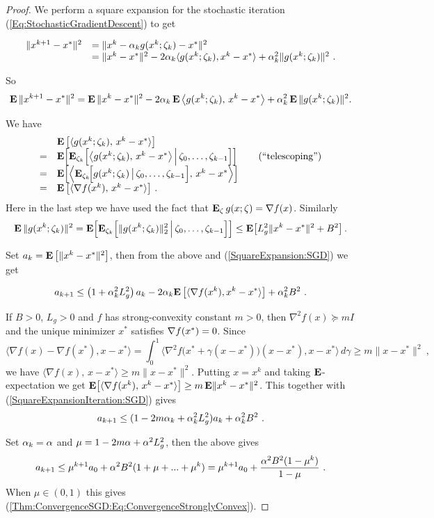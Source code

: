 \begin{proof}
We perform a square expansion for the stochastic iteration (\ref{Eq:StochasticGradientDescent}) to get

\begin{equation}\label{SquareExpansion:SGD}
\begin{array}{ll}
\|x^{k+1}-x^*\|^2&=\|x^k-\alpha_k g(x^k; \zeta_k)-x^*\|^2
\\
&=\|x^k-x^*\|^2-2\alpha_k\langle g(x^k; \zeta_k), x^k-x^*\rangle+\alpha_k^2\|g(x^k; \zeta_k)\|^2 \ .
\end{array}
\end{equation}

So
$$\mathbf E\,\|x^{k+1}-x^*\|^2
=
\mathbf E\,\|x^k-x^*\|^2
-2\alpha_k\,\mathbf E\,\bigl\langle g(x^k;\zeta_k),\,x^k-x^*\bigr\rangle
+\alpha_k^2\,\mathbf E\,\|g(x^k;\zeta_k)\|^2 .
$$

We have
$$\begin{array}{ll}
& \mathbf E\,\bigl[\langle g(x^k;\zeta_k),\,x^k-x^*\rangle\bigr]
\\
= &
\mathbf E\!\left[
\mathbf E_{\zeta_k}
\Bigl[
\bigl\langle g(x^k;\zeta_k),\,x^k-x^*\bigr\rangle
\,\Big|\,\zeta_0,\ldots,\zeta_{k-1}
\Bigr]
\right]
\qquad \text{(``telescoping'')}
\\
= & 
\mathbf E\!\left[
\left\langle
\mathbf E_{\zeta_k}\!\Bigl[g(x^k;\zeta_k)\,\big|\,\zeta_0,\ldots,\zeta_{k-1}\Bigr],
\,x^k-x^*
\right\rangle
\right]
\\
= & 
\mathbf E\,\bigl[\langle \nabla f(x^k),\,x^k-x^*\rangle\bigr] \ .
\end{array}
$$
Here in the last step we have used the fact that $
\mathbf E_{\zeta}\,g(x;\zeta)=\nabla f(x)$. Similarly
$$
\mathbf E\,\|g(x^k;\zeta_k)\|^2
=
\mathbf E\!\left[
\mathbf E_{\zeta_k}
\Bigl[
\|g(x^k;\zeta_k)\|_2^2
\,\Big|\,\zeta_0,\ldots,\zeta_{k-1}
\Bigr]
\right]
\le
\mathbf E\!\left[
L_g^2\|x^k-x^*\|^2 + B^2
\right].
$$

Set $a_k=\mathbf E\left[\|x^k-x^*\|^2\right]$, then from the above and (\ref{SquareExpansion:SGD}) we get

\begin{equation}\label{SquareExpansionIteration:SGD}
a_{k+1}\leq \left(1+\alpha_k^2L_g^2\right)a_k-2\alpha_k\mathbf E\left[\langle\nabla f(x^k), x^k-x^*\rangle\right]+\alpha_k^2B^2 \ .
\end{equation}

If $B>0$, $L_g>0$ and $f$ has strong-convexity constant $m>0$, then $
\nabla^2 f(x) \succeq m I$ and the unique minimizer $x^*$ satisfies $\nabla f(x^*)=0$. Since
$$
\langle \nabla f(x)-\nabla f(x^*), x-x^*\rangle
=
\int_0^1 \langle \nabla^2 f\bigl(x^*+\gamma(x-x^*)\bigr)(x-x^*), x-x^*\rangle \, d\gamma \geq m \|x-x^*\|^2 \ ,
$$
we have $
\bigl\langle \nabla f(x),\,x-x^*\bigr\rangle
\ge m \|x-x^*\|^2$. Putting $x=x^k$ and taking $\mathbf E$-expectation we get
$\mathbf E\bigl[\langle \nabla f(x^k),\,x^k-x^*\rangle\bigr]
\ge m\,\mathbf E\|x^k-x^*\|^2$. This together with (\ref{SquareExpansionIteration:SGD}) gives 
$$a_{k+1}\leq (1-2m\alpha_k +\alpha_k^2 L_g^2)a_k+\alpha_k^2B^2 \ .$$

Set $\alpha_k=\alpha$ and $\mu = 1-2m\alpha+\alpha^2L_g^2$, then the above gives
$$a_{k+1}\leq \mu^{k+1}a_0+\alpha^2B^2(1+\mu+...+\mu^k)=\mu^{k+1}a_0+\dfrac{\alpha^2B^2(1-\mu^k)}{1-\mu} \ .$$
When $\mu \in (0,1)$ this gives (\ref{Thm:ConvergenceSGD:Eq:ConvergenceStronglyConvex}).
\end{proof}

